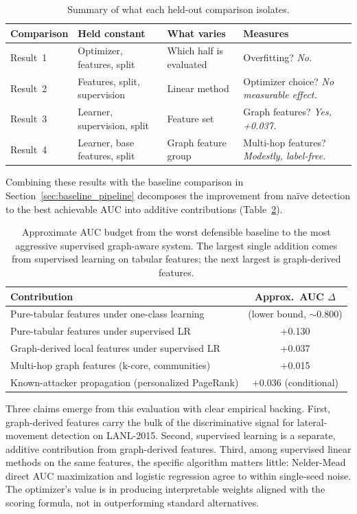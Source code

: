 \begin{table}[h]
\centering
\begin{tabular}{lp{2.2cm}p{2.0cm}p{2.2cm}}
\hline
Comparison & Held constant & What varies & Measures \\
\hline
Result~1 & Optimizer, features, split & Which half is evaluated & Overfitting? \emph{No.} \\
Result~2 & Features, split, supervision & Linear method & Optimizer choice? \emph{No measurable effect.} \\
Result~3 & Learner, supervision, split & Feature set & Graph features? \emph{Yes, +0.037.} \\
Result~4 & Learner, base features, split & Graph feature group & Multi-hop features? \emph{Modestly, label-free.} \\
\hline
\end{tabular}
\caption{Summary of what each held-out comparison isolates.}
\label{tab:synthesis_axes}
\end{table}

Combining these results with the baseline comparison in Section~\ref{sec:baseline_pipeline} decomposes the improvement from na\"ive detection to the best achievable AUC into additive contributions (Table~\ref{tab:auc_budget}).

\begin{table}[h]
\centering
\begin{tabular}{lc}
\hline
Contribution & Approx.\ AUC $\Delta$ \\
\hline
Pure-tabular features under one-class learning & (lower bound, $\sim$0.800) \\
Pure-tabular features under supervised LR      & +0.130 \\
Graph-derived local features under supervised LR & +0.037 \\
Multi-hop graph features (k-core, communities)  & +0.015 \\
Known-attacker propagation (personalized PageRank) & +0.036 (conditional) \\
\hline
\end{tabular}
\caption{Approximate AUC budget from the worst defensible baseline to the most aggressive supervised graph-aware system. The largest single addition comes from supervised learning on tabular features; the next largest is graph-derived features.}
\label{tab:auc_budget}
\end{table}

Three claims emerge from this evaluation with clear empirical backing. First, graph-derived features carry the bulk of the discriminative signal for lateral-movement detection on LANL-2015. Second, supervised learning is a separate, additive contribution from graph-derived features. Third, among supervised linear methods on the same features, the specific algorithm matters little: Nelder-Mead direct AUC maximization and logistic regression agree to within single-seed noise. The optimizer's value is in producing interpretable weights aligned with the scoring formula, not in outperforming standard alternatives.
